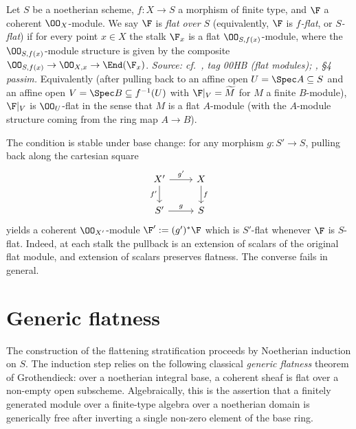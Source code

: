 \begin{definition}\leanok
  \label{def:coherent_sheaf_flat}
  Let \(S\) be a noetherian scheme, \(f : X \to S\) a morphism of finite type, and
  \(\F\) a coherent \(\OO_X\)-module.  We say \(\F\) is \emph{flat over \(S\)}
  (equivalently, \(\F\) is \emph{\(f\)-flat}, or \emph{\(S\)-flat}) if for every
  point \(x \in X\) the stalk \(\F_x\) is a flat \(\OO_{S, f(x)}\)-module, where the
  \(\OO_{S, f(x)}\)-module structure is given by the composite
  \(\OO_{S, f(x)} \to \OO_{X, x} \to \End(\F_x)\).
  \textit{Source: cf.\ \cite{stacks-project}, tag 00HB (flat modules); \cite{nitsure-hilbert-quot}, \S4
  passim.}
  Equivalently (after pulling back to an affine open \(U = \Spec A \subseteq S\) and
  an affine open \(V = \Spec B \subseteq f^{-1}(U)\) with \(\F|_V = \widetilde{M}\)
  for \(M\) a finite \(B\)-module), \(\F|_V\) is \(\OO_U\)-flat in the sense that \(M\) is a
  flat \(A\)-module (with the \(A\)-module structure coming from the ring map
  \(A \to B\)).
\end{definition}

\begin{remark}
\label{rem:coh_flat_pullback}
  The condition is stable under base change: for any morphism \(g : S' \to S\),
  pulling back along the cartesian square
  \[
    \begin{tikzcd}
      X' \ar[r, "g'"] \ar[d, "f'"'] & X \ar[d, "f"] \\
      S' \ar[r, "g"]                & S
    \end{tikzcd}
  \]
  yields a coherent \(\OO_{X'}\)-module \(\F' := (g')^* \F\) which is \(S'\)-flat
  whenever \(\F\) is \(S\)-flat.  Indeed, at each stalk the pullback is an
  extension of scalars of the original flat module, and extension of scalars
  preserves flatness. The converse fails in general.
\end{remark}

\section{Generic flatness}
\label{sec:generic_flatness}

The construction of the flattening stratification proceeds by Noetherian
induction on \(S\). The induction step relies on the following classical
\emph{generic flatness} theorem of Grothendieck: over a noetherian integral
base, a coherent sheaf is flat over a non-empty open subscheme. Algebraically,
this is the assertion that a finitely generated module over a finite-type
algebra over a noetherian domain is generically free after inverting a single
non-zero element of the base ring.

